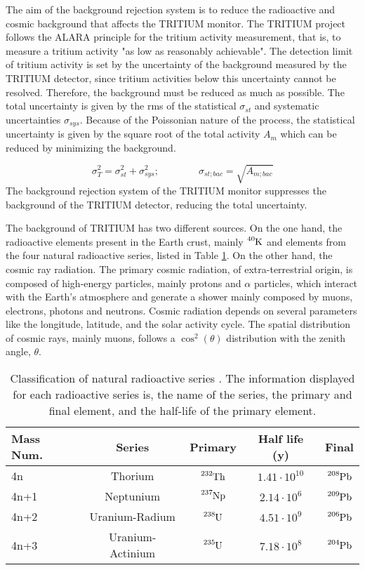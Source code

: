 The aim of the background rejection system is to reduce the radioactive and cosmic background that affects the TRITIUM monitor. The TRITIUM project follows the ALARA principle for the tritium activity measurement, that is, to measure a tritium activity "as low as reasonably achievable". The detection limit of tritium activity is set by the uncertainty of the background measured by the TRITIUM detector, since tritium activities below this uncertainty cannot be resolved. Therefore, the background must be reduced as much as possible. The total uncertainty is given by the rms of the statistical $\sigma_{st}$ and  systematic uncertainties $\sigma_{sys}$. Because of the Poissonian nature of the process, the statistical uncertainty is given by the square root of the total activity $A_{m}$ which can be reduced by minimizing the background.

\begin{equation}
\sigma_{T}^2 = \sigma_{st}^2 +\sigma_{sys}^2; \qquad \qquad \sigma_{st;bac} = \sqrt{A_{m;bac}}
\label{eq:SquareSumUncerainty}
\end{equation} 
The background rejection system of the TRITIUM monitor suppresses the background of the TRITIUM detector, reducing the total uncertainty.

The background of TRITIUM has two different sources. On the one hand, the radioactive elements present in the Earth crust, mainly $\ce{^{40}K}$ and elements from the four natural radioactive series, listed in Table \ref{tab:NaturalRadioactiveSeries}. On the other hand, the cosmic ray radiation. The primary cosmic radiation, of extra-terrestrial origin, is composed of high-energy particles, mainly protons and $\alpha$ particles, which interact with the Earth's atmosphere and generate a shower mainly composed by muons, electrons, photons and neutrons. Cosmic radiation depends on several parameters like the longitude, latitude, and the solar activity cycle. The spatial distribution of cosmic rays, mainly muons, follows a $\cos^2(\theta)$ distribution with the zenith angle, $\theta$. 

\begin{table}[htbp]
\centering{}%
\begin{tabular}{lcccc}
\toprule 
Mass Num. & Series & Primary & Half life (y) & Final \tabularnewline
\midrule
\midrule 
4n & Thorium & $\ce{^{232}Th}$ & $1.41 \cdot{} 10^{10}$ & $\ce{^{208}Pb}$ \tabularnewline
4n+1 & Neptunium & $\ce{^{237}Np}$ & $2.14 \cdot{} 10^{6}$ & $\ce{^{209}Pb}$ \tabularnewline
4n+2 & Uranium-Radium & $\ce{^{238}U}$ & $4.51 \cdot{} 10^{9}$ & $\ce{^{206}Pb}$ \tabularnewline
4n+3 & Uranium-Actinium & $\ce{^{235}U}$ & $7.18 \cdot{} 10^{8}$ & $\ce{^{204}Pb}$ \tabularnewline
\bottomrule
\end{tabular}
\caption{Classification of natural radioactive series \cite{NaturalRadioactiveSeries1, NaturalRadioactiveSeries2}. The information displayed for each radioactive series is, the name of the series, the primary and final element, and the half-life of the primary element.}
\label{tab:NaturalRadioactiveSeries}
\end{table}

